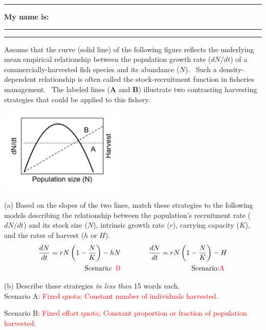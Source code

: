 \documentclass{article}
\newcommand{\ind}{\-\hspace{1cm}}
\newcommand*{\blanks}[1][4em]{\rule{#1}{.4pt}}
\begin{document}
\noindent{}

\rule[0.5ex]{\linewidth}{1pt}
\begin{center}
	\textbf{My name is:} \blanks[150pt]
\end{center}
\rule[0.5ex]{\linewidth}{1pt}

Assume that the curve (solid line) of the following figure reflects the underlying mean empirical relationship between the population growth rate ($dN/dt$) of a commercially-harvested fish species and its abundance ($N$).  Such a density-dependent relationship is often called the stock-recruitment function in fisheries management.  The labeled lines (\textbf{A} and \textbf{B}) illustrate two contrasting harvesting strategies that could be applied to this fishery.
\begin{center}
\includegraphics[width=6cm]{figs/image}\\
\end{center}
(a) Based on the slopes of the two lines, match these strategies to the following models describing the relationship between the population's recruitment rate ($dN/dt$) and its stock size ($N$), intrinsic growth rate ($r$), carrying capacity ($K$), and the rates of harvest ($h$ or $H$).
\begin{align*}
	\frac{dN}{dt}=rN \left(1-\frac{N}{K}\right)-hN &\quad \quad \quad &   \frac{dN}{dt}=rN \left(1-\frac{N}{K}\right)-H \\
	\text{Scenario: \textcolor{red}{B}} & \quad \quad \quad & \text{Scenario:\textcolor{red}{A} }
\end{align*}

\vspace{1cm}

(b) Describe these strategies \emph{in less than} 15 words each.\\
\ind Scenario A: \textcolor{red}{Fixed quota; Constant number of individuals harvested.} \\
\vspace{1cm}

\ind Scenario B: \textcolor{red}{Fixed effort quota; Constant proportion or fraction of population harvested.}\\
\vspace{1cm}
\end{document}
